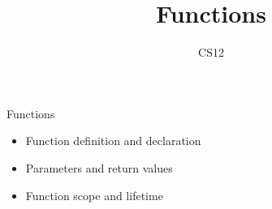 \documentclass{beamer}
\title{Functions}
\author{CS12}
\date{}
\begin{document}
\begin{frame}
    \titlepage
\end{frame}

\begin{frame}{Functions}
    \begin{itemize}
        \item Function definition and declaration
        \item Parameters and return values
        \item Function scope and lifetime
    \end{itemize}
\end{frame}
\end{document}
